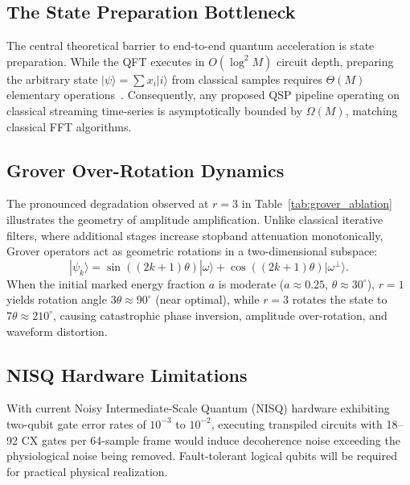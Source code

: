 \documentclass[journal,compsoc]{IEEEtran}
\begin{document}
\subsection{The State Preparation Bottleneck}
The central theoretical barrier to end-to-end quantum acceleration is state preparation. While the QFT executes in $O(\log^2 M)$ circuit depth, preparing the arbitrary state $|\psi\rangle = \sum x_i |i\rangle$ from classical samples requires $\Theta(M)$ elementary operations~\cite{shende2006synthesis,aaronson2015read}. Consequently, any proposed QSP pipeline operating on classical streaming time-series is asymptotically bounded by $\Omega(M)$, matching classical FFT algorithms.

\subsection{Grover Over-Rotation Dynamics}
The pronounced degradation observed at $r=3$ in Table~\ref{tab:grover_ablation} illustrates the geometry of amplitude amplification. Unlike classical iterative filters, where additional stages increase stopband attenuation monotonically, Grover operators act as geometric rotations in a two-dimensional subspace:
\begin{equation}
|\psi_k\rangle = \sin((2k+1)\theta) |\omega\rangle + \cos((2k+1)\theta) |\omega^\perp\rangle.
\end{equation}
When the initial marked energy fraction $a$ is moderate ($a \approx 0.25$, $\theta \approx 30^\circ$), $r=1$ yields rotation angle $3\theta \approx 90^\circ$ (near optimal), while $r=3$ rotates the state to $7\theta \approx 210^\circ$, causing catastrophic phase inversion, amplitude over-rotation, and waveform distortion.

\subsection{NISQ Hardware Limitations}
With current Noisy Intermediate-Scale Quantum (NISQ) hardware exhibiting two-qubit gate error rates of $10^{-3}$ to $10^{-2}$, executing transpiled circuits with 18--92 CX gates per 64-sample frame would induce decoherence noise exceeding the physiological noise being removed. Fault-tolerant logical qubits will be required for practical physical realization.
\end{document}
